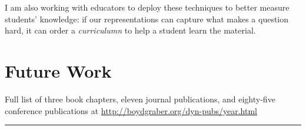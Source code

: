 I am also working with educators to deploy these techniques to better
measure students' knowledge: if our representations can capture what
makes a question hard, it can order a \emph{curriculumn} to help a
student learn the material.

\section{Future Work}



\clearpage




\begin{center}
Full list of  three book chapters, eleven journal publications, and eighty-five conference
publications at \url{http://boydgraber.org/dyn-pubs/year.html}
\end{center}

%

\noindent\rule{4cm}{0.4pt}

